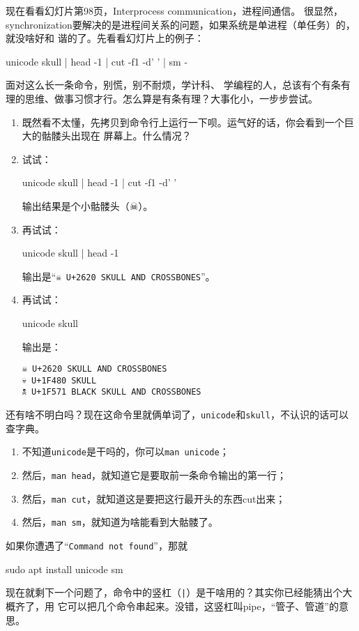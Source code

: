 \documentclass{wx672ctexart}
\newcommand\mpic[1]{%
  \marginpar{\texttt{[image: thumbnails/\#1]}}}
\begin{document}
\mpic{pg_0099}现在看看幻灯片第98页，Interprocess communication，进程间通信。
很显然，synchronization要解决的是进程间关系的问题，如果系统是单进程（单任务）的，就没啥好和
谐的了。先看看幻灯片上的例子：
\begin{shellcode}
  unicode skull | head -1 | cut -f1 -d' ' | sm -
\end{shellcode}
面对这么长一条命令，别慌，别不耐烦，学计科、
学编程的人，总该有个有条有理的思维、做事习惯才行。怎么算是有条有理？大事化小，一步步尝试。
\begin{enumerate}
\item 既然看不太懂，先拷贝到命令行上运行一下呗。运气好的话，你会看到一个巨大的骷髅头出现在
  屏幕上。什么情况？
\item 试试：
  \begin{shellcode}
    unicode skull | head -1 | cut -f1 -d' '
  \end{shellcode}
  输出结果是个小骷髅头（{\dejavu ☠}）。
\item 再试试：
  \begin{shellcode}
    unicode skull | head -1
  \end{shellcode}
  输出是“\verb|☠ U+2620 SKULL AND CROSSBONES|”。
\item 再试试：
  \begin{shellcode}
    unicode skull
  \end{shellcode}
  输出是：
\begin{verbatim}
☠ U+2620 SKULL AND CROSSBONES
💀 U+1F480 SKULL
🕱 U+1F571 BLACK SKULL AND CROSSBONES
\end{verbatim}
\end{enumerate}
还有啥不明白吗？现在这命令里就俩单词了，\texttt{unicode}和\texttt{skull}，不认识的话可以
查字典。
\begin{enumerate}
\item 不知道\texttt{unicode}是干吗的，你可以\texttt{man unicode}；
\item 然后，\texttt{man head}，就知道它是要取前一条命令输出的第一行；
\item 然后，\texttt{man cut}，就知道这是要把这行最开头的东西cut出来；
\item 然后，\texttt{man sm}，就知道为啥能看到大骷髅了。
\end{enumerate}

如果你遭遇了“\texttt{Command not found}”，那就
\begin{shellcode}
  sudo apt install unicode sm
\end{shellcode}
现在就剩下一个问题了，命令中的竖杠（\texttt{|}）是干啥用的？其实你已经能猜出个大概齐了，用
它可以把几个命令串起来。没错，这竖杠叫pipe，“管子、管道”的意思。
\end{document}
